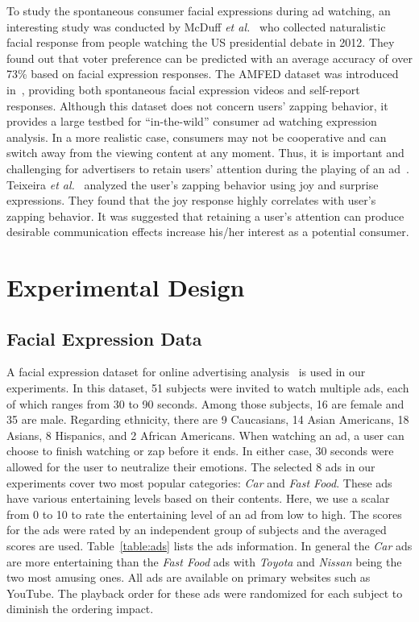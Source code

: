 \documentclass[twoside,leqno,twocolumn]{article}
\begin{document}
To study the spontaneous consumer facial expressions during ad watching, an interesting study was conducted by McDuff \textit{et al.}~\cite{McDuff13} who collected naturalistic facial response from people watching the US presidential debate in 2012. They found out that voter preference can be predicted with an average accuracy of over 73\% based on facial expression responses. The AMFED dataset was introduced in~\cite{amfed}, providing both spontaneous facial expression videos and self-report responses. Although this dataset does not concern users' zapping behavior, it provides a large testbed for ``in-the-wild'' consumer ad watching expression analysis. In a more realistic case, consumers may not be cooperative and can switch away from the viewing content at any moment. Thus, it is important and challenging for advertisers to retain users' attention during the playing of an ad~\cite{Elpers03}. Teixeira \textit{et al.}~\cite{Teixeira12} analyzed the user's zapping behavior using joy and surprise expressions. They found that the joy response highly correlates with user's zapping behavior. It was suggested that retaining a user's attention can produce desirable communication effects increase his/her interest as a potential consumer. 


\section{Experimental Design}

\subsection{Facial Expression Data}

A facial expression dataset for online advertising analysis~\cite{Yang_FG15} is used in our experiments. In this dataset, 51 subjects were invited to watch multiple ads, each of which ranges from 30 to 90 seconds. Among those subjects, 16 are female and 35 are male. Regarding ethnicity, there are 9 Caucasians, 14 Asian Americans, 18 Asians, 8 Hispanics, and 2 African Americans. When watching an ad, a user can choose to finish watching or zap before it ends. In either case, 30 seconds were allowed for the user to neutralize their emotions. The selected 8 ads in our experiments cover two most popular categories: \textit{Car} and \textit{Fast Food}. These ads have various entertaining levels based on their contents. Here, we use a scalar from 0 to 10 to rate the entertaining level of an ad from low to high. The scores for the ads were rated by an independent group of subjects and the averaged scores are used. Table~\ref{table:ads} lists the ads information. In general the \textit{Car} ads are more entertaining than the \textit{Fast Food} ads with \textit{Toyota} and \textit{Nissan} being the two most amusing ones. All ads are available on primary websites such as YouTube. The playback order for these ads were randomized for each subject to diminish the ordering impact. 
\end{document}
